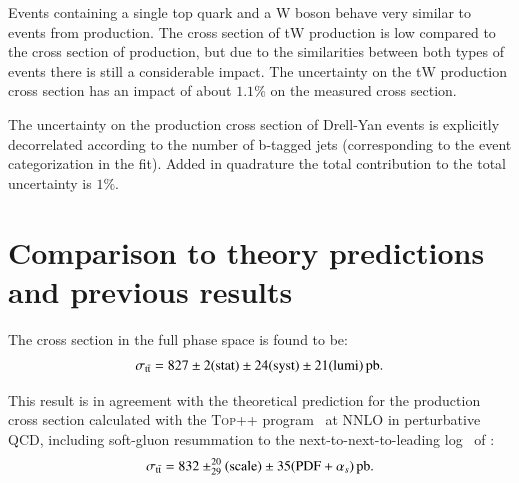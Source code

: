 

Events containing a single top quark and a W boson behave very similar to events from \ttbar production. The cross section of tW production is low compared to the cross section of \ttbar production, but due to the similarities between
both types of events there is still a considerable impact. The uncertainty on the tW production cross section has an impact of about $1.1 \%$ on the measured \ttbar cross section.

The uncertainty on the production cross section of Drell-Yan events is explicitly decorrelated according to the number of b-tagged jets (corresponding to the event categorization in the fit).
Added in quadrature the total contribution to the total uncertainty is $1\%$.


\section{Comparison to theory predictions and previous results}
\label{sec:results_comp}

The cross section in the full phase space is found to be:
\begin{equation}
\sigma_\mathrm{t\bar{t}}  =  827 \pm 2 ({\rm stat}) \pm 24 ({\rm syst}) \pm 21 ({\rm lumi}) \mbox{\ensuremath{\,\text{pb}}}.
\end{equation}
 
This result is in agreement with the theoretical prediction for the \ttbar production cross section calculated with the \textsc{Top++} program~\cite{Czakon:2011xx} at NNLO in perturbative QCD, including soft-gluon resummation to the next-to-next-to-leading log~\cite{Andreev:2017vxu} of :
\begin{equation}
\sigma_\mathrm{t\bar{t}} =  832 \pm^{20}_{29} {\rm (scale)} \pm 35({\rm PDF}+\alpha_s) \mbox{\ensuremath{\,\text{pb}}}.
\end{equation}

